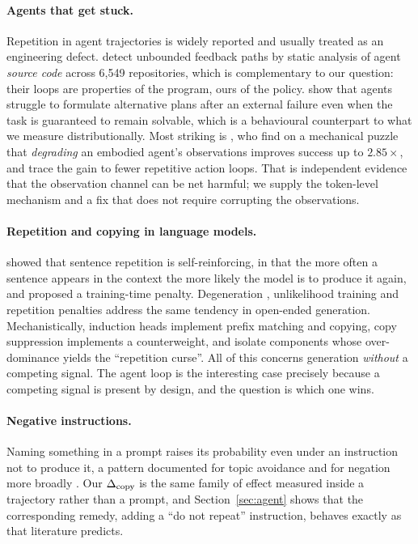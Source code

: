 \paragraph{Agents that get stuck.}
Repetition in agent trajectories is widely reported and usually treated as an
engineering defect. \citet{hou2026infiniteloops} detect unbounded feedback paths
by static analysis of agent \emph{source code} across 6{,}549 repositories,
which is complementary to our question: their loops are properties of the
program, ours of the policy. \citet{wang2025hellorhighwater} show that agents
struggle to formulate alternative plans after an external failure even when the task is guaranteed to remain solvable, which is a behavioural counterpart
to what we measure distributionally. Most striking is \citet{zenkri2026fidelity}, who find
on a mechanical puzzle that \emph{degrading} an embodied agent's observations
improves success up to $2.85\times$, and trace the gain to fewer repetitive
action loops. That is independent evidence that the observation channel can be
net harmful; we supply the token-level mechanism and a fix that does not require
corrupting the observations.

\paragraph{Repetition and copying in language models.}
\citet{xu2022breaktheloop} showed that sentence repetition is
self-reinforcing, in that the more often a sentence appears in the context the
more likely the model is to produce it again, and proposed a training-time
penalty.
Degeneration \citep{holtzman2020degeneration}, unlikelihood training
\citep{welleck2020unlikelihood} and repetition penalties \citep{keskar2019ctrl}
address the same tendency in open-ended generation. Mechanistically, induction
heads \citep{olsson2022induction} implement prefix matching and copying, copy
suppression \citep{mcdougall2024copysuppression} implements a counterweight, and
\citet{repetitionneurons2025} isolate components whose over-dominance yields the
``repetition curse''. All of this concerns generation \emph{without} a competing
signal. The agent loop is the interesting case precisely because a competing
signal is present by design, and the question is which one wins.

\paragraph{Negative instructions.}
Naming something in a prompt raises its probability even under an instruction
not to produce it, a pattern documented for topic avoidance
\citep{castricato2024pinkelephants,nopinkelephant2024} and for negation more
broadly \citep{negation2025pinkelephant}. Our $\Delta_{\mathrm{copy}}$ is the same family of
effect measured inside a trajectory rather than a prompt, and
Section~\ref{sec:agent} shows that the corresponding remedy, adding a
``do not repeat'' instruction, behaves exactly as that literature predicts.

